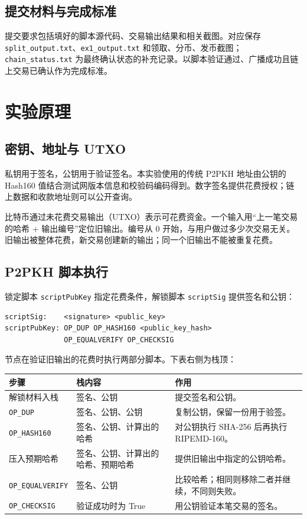 \documentclass[UTF8,a4paper,11pt,fontset=windows]{ctexart}
\begin{document}
\subsection{提交材料与完成标准}
提交要求包括填好的脚本源代码、交易输出结果和相关截图。对应保存 \texttt{split\_output.txt}、\texttt{ex1\_output.txt} 和领取、分币、发币截图；\texttt{chain\_status.txt} 为最终确认状态的补充记录。以脚本验证通过、广播成功且链上交易已确认作为完成标准。

\newpage
\section{实验原理}
\subsection{密钥、地址与 UTXO}
私钥用于签名，公钥用于验证签名。本实验使用的传统 P2PKH 地址由公钥的 Hash160 值结合测试网版本信息和校验码编码得到。数字签名提供花费授权；链上数据和收款地址则可以公开查询。

比特币通过未花费交易输出（UTXO）表示可花费资金。一个输入用“上一笔交易的哈希 + 输出编号”定位旧输出。编号从 0 开始，与用户做过多少次交易无关。旧输出被整体花费，新交易创建新的输出；同一个旧输出不能被重复花费。
\subsection{P2PKH 脚本执行}
锁定脚本 \texttt{scriptPubKey} 指定花费条件，解锁脚本 \texttt{scriptSig} 提供签名和公钥：
\begin{lstlisting}[language={}]
scriptSig:    <signature> <public_key>
scriptPubKey: OP_DUP OP_HASH160 <public_key_hash>
              OP_EQUALVERIFY OP_CHECKSIG
\end{lstlisting}
节点在验证旧输出的花费时执行两部分脚本。下表右侧为栈顶：
\par\noindent\begin{tabularx}{\linewidth}{@{}l X X@{}}
\toprule 步骤 & 栈内容 & 作用 \\
\midrule
解锁材料入栈 & 签名、公钥 & 提交签名和公钥。\\
\texttt{OP\_DUP} & 签名、公钥、公钥 & 复制公钥，保留一份用于验签。\\
\texttt{OP\_HASH160} & 签名、公钥、计算出的哈希 & 对公钥执行 SHA-256 后再执行 RIPEMD-160。\\
压入预期哈希 & 签名、公钥、计算出的哈希、预期哈希 & 提供旧输出中指定的公钥哈希。\\
\texttt{OP\_EQUALVERIFY} & 签名、公钥 & 比较哈希；相同则移除二者并继续，不同则失败。\\
\texttt{OP\_CHECKSIG} & 验证成功时为 True & 用公钥验证本笔交易的签名。\\
\bottomrule
\end{tabularx}
\end{document}
